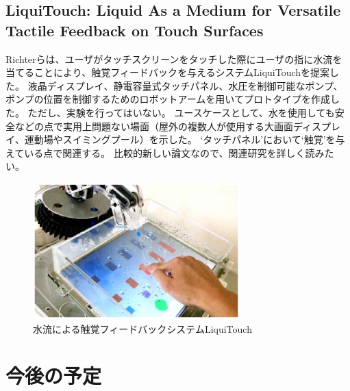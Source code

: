 \documentclass[11pt,a4paper]{jarticle}
\begin{document}
\subsection{LiquiTouch: Liquid As a Medium for Versatile Tactile Feedback on Touch Surfaces\cite{Richter:2013}}
Richterらは、ユーザがタッチスクリーンをタッチした際にユーザの指に水流を当てることにより、触覚フィードバックを与えるシステムLiquiTouchを提案した。
液晶ディスプレイ、静電容量式タッチパネル、水圧を制御可能なポンプ、ポンプの位置を制御するためのロボットアームを用いてプロトタイプを作成した。
ただし、実験を行ってはいない。
ユースケースとして、水を使用しても安全などの点で実用上問題ない場面（屋外の複数人が使用する大画面ディスプレイ、運動場やスイミングプール）を示した。
`タッチパネル'において`触覚'を与えている点で関連する。
比較的新しい論文なので、関連研究を詳しく読みたい。
\begin{figure}[H]
  \begin{center}
  \includegraphics[width=8cm]{figure6.eps}
  \caption{水流による触覚フィードバックシステムLiquiTouch}
  \end{center}
\end{figure}

\section{今後の予定}



\end{document}
